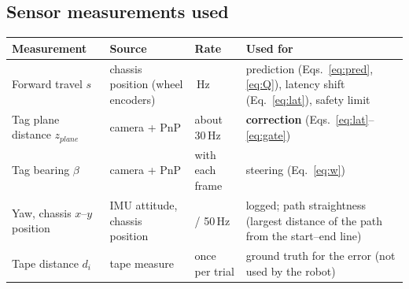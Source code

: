\documentclass[11pt,a4paper]{article}
\begin{document}
\subsection{Sensor measurements used}
\begin{center}\small
\begin{tabular}{@{}>{\raggedright\arraybackslash}p{3.3cm}>{\raggedright\arraybackslash}p{3.6cm}>{\raggedright\arraybackslash}p{2.2cm}>{\raggedright\arraybackslash}p{6.0cm}@{}}
\toprule
\textbf{Measurement} & \textbf{Source} & \textbf{Rate} & \textbf{Used for}\\\midrule
Forward travel $s$ & chassis position (wheel encoders) & 50\,Hz & prediction (Eqs.~\ref{eq:pred}, \ref{eq:Q}), latency shift (Eq.~\ref{eq:lat}), safety limit\\
Tag plane distance $z_{plane}$ & camera + PnP & about 30\,Hz & \textbf{correction} (Eqs.~\ref{eq:lat}--\ref{eq:gate})\\
Tag bearing $\beta$ & camera + PnP & with each frame & steering (Eq.~\ref{eq:w})\\
Yaw, chassis $x$--$y$ position & IMU attitude, chassis position & 20 / 50\,Hz & logged; path straightness (largest distance of the path from the start--end line)\\
Tape distance $d_i$ & tape measure & once per trial & ground truth for the error (not used by the robot)\\
\bottomrule
\end{tabular}
\end{center}

\end{document}
